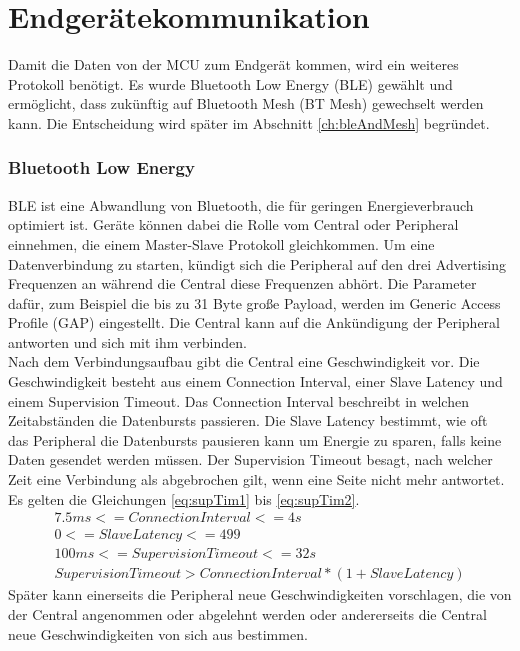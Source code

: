 \section{Endgerätekommunikation}
Damit die Daten von der MCU zum Endgerät kommen, wird ein weiteres Protokoll benötigt.
Es wurde Bluetooth Low Energy (BLE) gewählt und ermöglicht, dass zukünftig auf Bluetooth Mesh (BT Mesh) gewechselt werden kann.
Die Entscheidung wird später im Abschnitt \ref{ch:bleAndMesh} begründet.

\subsubsection{Bluetooth Low Energy}
BLE ist eine Abwandlung von Bluetooth, die für geringen Energieverbrauch optimiert ist.
Geräte können dabei die Rolle vom Central oder Peripheral einnehmen, die einem Master-Slave Protokoll gleichkommen.
Um eine Datenverbindung zu starten, kündigt sich die Peripheral auf den drei Advertising Frequenzen an während die Central diese Frequenzen abhört.
Die Parameter dafür, zum Beispiel die bis zu 31 Byte große Payload, werden im Generic Access Profile (GAP) eingestellt.
Die Central kann auf die Ankündigung der Peripheral antworten und sich mit ihm verbinden. \cite{site_adabt}\\
Nach dem Verbindungsaufbau gibt die Central eine Geschwindigkeit vor.
Die Geschwindigkeit besteht aus einem Connection Interval, einer Slave Latency und einem Supervision Timeout.
Das Connection Interval beschreibt in welchen Zeitabständen die Datenbursts passieren.
Die Slave Latency bestimmt, wie oft das Peripheral die Datenbursts pausieren kann um Energie zu sparen, falls keine Daten gesendet werden müssen.
Der Supervision Timeout besagt, nach welcher Zeit eine Verbindung als abgebrochen gilt, wenn eine Seite nicht mehr antwortet.
Es gelten die Gleichungen \ref{eq:supTim1} bis \ref{eq:supTim2}.
\begin{gather}
  \label{eq:supTim1}
	7.5 ms <= Connection Interval <= 4 s\\
	0 <= Slave Latency <= 499\\
	100 ms <= Supervision Timeout <= 32 s\\
  \label{eq:supTim2}
	Supervision Timeout > Connection Interval * (1 + Slave Latency)
\end{gather}
Später kann einerseits die Peripheral neue Geschwindigkeiten vorschlagen, die von der Central angenommen oder abgelehnt werden oder andererseits die Central neue Geschwindigkeiten von sich aus bestimmen. \cite{site_tigap}\\
